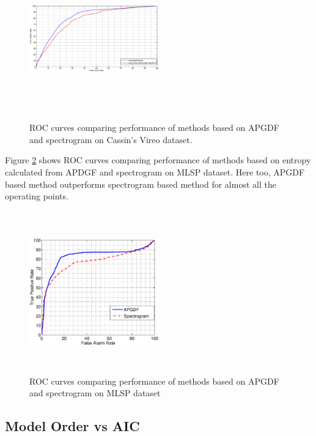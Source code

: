 \documentclass[a4paper]{article}
\begin{document}
\begin{figure}[h]
\centering
\includegraphics[width=0.5\textwidth,height=7cm]{ROC_gr_delay_5_VS_spectrogram.eps}
\caption{ROC  curves  comparing  performance  of  methods based on APGDF and spectrogram on Cassin's Vireo dataset.}
\label{fig:ROCdata1}
\end{figure}



 
 
 
 Figure \ref{fig:ROCdata2} shows ROC curves comparing performance of methods based on entropy calculated from APDGF  and spectrogram on MLSP dataset. Here too, APGDF based method outperforms spectrogram based method for almost all the operating points. 

 
\begin{figure}[!ht]
	\centering
	\includegraphics[width=0.5\textwidth,height=7cm] {ROC_gr_delay_10_VS_spectrogram_data2.eps}
	\caption{ROC curves comparing performance of methods based on APGDF and spectrogram on MLSP dataset }   
	\label{fig:ROCdata2}
\end{figure} 




 \subsection{Model Order  vs AIC}
 
\end{document}
